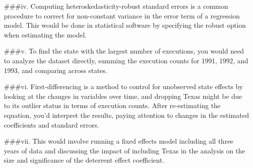 \documentclass[
]{article}
\begin{document}
\#\#\#iv. Computing heteroskedasticity-robust standard errors is a
common procedure to correct for non-constant variance in the error term
of a regression model. This would be done in statistical software by
specifying the robust option when estimating the model.

\#\#\#v. To find the state with the largest number of executions, you
would need to analyze the dataset directly, summing the execution counts
for 1991, 1992, and 1993, and comparing across states.

\#\#\#vi. First-differencing is a method to control for unobserved state
effects by looking at the changes in variables over time, and dropping
Texas might be due to its outlier status in terms of execution counts.
After re-estimating the equation, you'd interpret the results, paying
attention to changes in the estimated coefficients and standard errors.

\#\#\#vii. This would involve running a fixed effects model including
all three years of data and discussing the impact of including Texas in
the analysis on the size and significance of the deterrent effect
coefficient.
\end{document}
